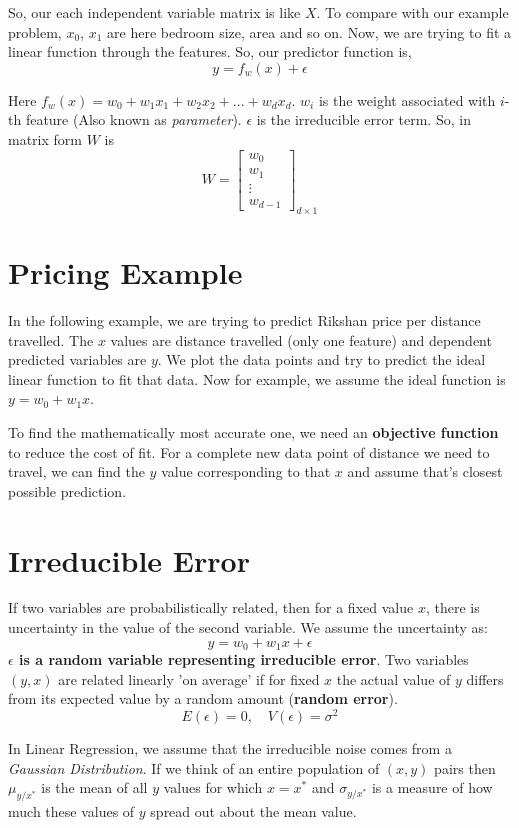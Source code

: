 \documentclass[11pt,fleqn]{book}
\begin{document}
So, our each independent variable matrix is like $X$. To compare with our example problem, $x_0$, $x_1$ are here bedroom size, area and so on. Now, we are trying to fit a linear function through the features. So, our predictor function is,
\[y = f_w(x) + \epsilon\]

Here $f_w(x) = w_0 + w_1x_1 + w_2x_2 + ... + w_dx_d$. $w_i$ is the weight associated with $i$-th feature (Also known as \textit{parameter}). $\epsilon$ is the irreducible error term. So, in matrix form $W$ is
\[W = \begin{bmatrix}
w_0 \\
w_1 \\
\vdots \\
w_{d-1}
\end{bmatrix}_{d \times 1}\]

\section{Pricing Example}
In the following example, we are trying to predict Rikshan price per distance travelled. The $x$ values are distance travelled (only one feature) and dependent predicted variables are $y$. We plot the data points and try to predict the ideal linear function to fit that data. Now for example, we assume the ideal function is \textbf{$y = w_0 + w_1x$}.

\begin{callout}
    To find the mathematically most accurate one, we need an \textbf{objective function} to reduce the cost of fit. For a complete new data point of distance we need to travel, we can find the $y$ value corresponding to that $x$ and assume that's closest possible prediction.
\end{callout}

\section{Irreducible Error}
If two variables are probabilistically related, then for a fixed value $x$, there is uncertainty in the value of the second variable. We assume the uncertainty as:
\[y = w_0 + w_1x + \epsilon\]
\textbf{$\epsilon$ is a random variable representing irreducible error}. Two variables $(y, x)$ are related linearly 'on average' if for fixed $x$ the actual value of $y$ differs from its expected value by a random amount (\textbf{random error}).
\[E(\epsilon) = 0, \quad V(\epsilon) = \sigma^2\]

\begin{callout}
    In Linear Regression, we assume that the irreducible noise comes from a \textit{Gaussian Distribution}. If we think of an entire population of $(x, y)$ pairs then $\mu_{y/x^*}$ is the mean of all $y$ values for which $x=x^*$ and $\sigma_{y/x^*}$ is a measure of how much these values of $y$ spread out about the mean value.
\end{callout}
\end{document}
